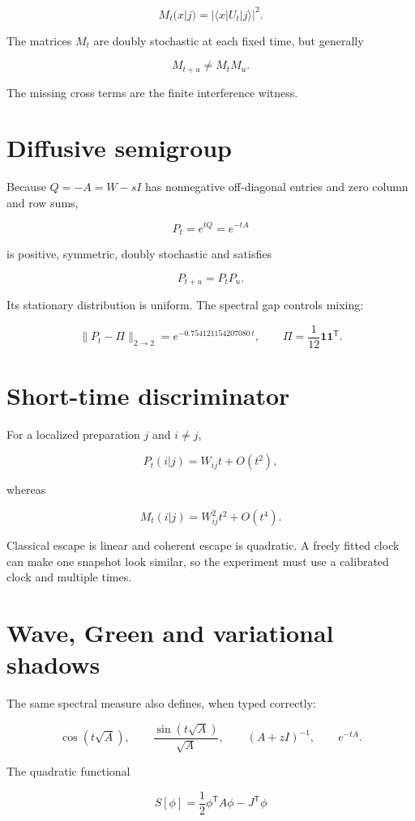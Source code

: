 \documentclass[11pt,a4paper,openany]{report}
\begin{document}
\[
M_t(x|j)=|\langle x|U_t|j\rangle|^2.
\]

The matrices \(M_t\) are doubly stochastic at each fixed time, but generally

\[
M_{t+u}\neq M_tM_u.
\]

The missing cross terms are the finite interference witness.

\section{Diffusive semigroup}

Because \(Q=-A=W-sI\) has nonnegative off-diagonal entries and zero column and row sums,

\[
P_t=e^{tQ}=e^{-tA}
\]

is positive, symmetric, doubly stochastic and satisfies

\[
P_{t+u}=P_tP_u.
\]

Its stationary distribution is uniform. The spectral gap controls mixing:

\[
\|P_t-\Pi\|_{2\to2}=e^{-0.754121154207080\,t},
\qquad
\Pi=\frac1{12}\mathbf1\mathbf1^\mathsf T.
\]

\section{Short-time discriminator}

For a localized preparation \(j\) and \(i\neq j\),

\[
P_t(i|j)=W_{ij}t+O(t^2),
\]

whereas

\[
M_t(i|j)=W_{ij}^2t^2+O(t^4).
\]

Classical escape is linear and coherent escape is quadratic. A freely fitted clock can make one snapshot look similar, so the experiment must use a calibrated clock and multiple times.

\section{Wave, Green and variational shadows}

The same spectral measure also defines, when typed correctly:

\[
\cos(t\sqrt A),\qquad
\frac{\sin(t\sqrt A)}{\sqrt A},\qquad
(A+zI)^{-1},
\qquad
e^{-tA}.
\]

The quadratic functional

\[
S[\phi]
=
\frac12\phi^\mathsf TA\phi-J^\mathsf T\phi
\]
\end{document}
